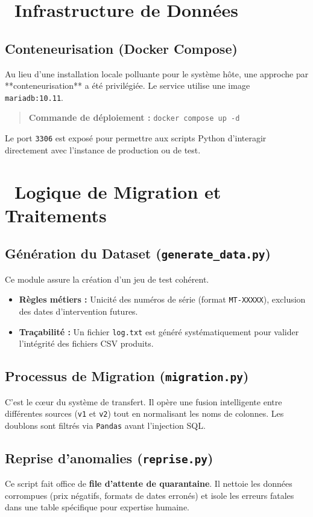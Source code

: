 \documentclass[12pt, a4paper]{article}
\begin{document}
\section{\faDocker \ Infrastructure de Données}
\subsection{Conteneurisation (Docker Compose)}
Au lieu d'une installation locale polluante pour le système hôte, une approche par **conteneurisation** a été privilégiée. Le service utilise une image \texttt{mariadb:10.11}. 
\begin{quote}
    \textbf{Commande de déploiement :} \texttt{docker compose up -d}
\end{quote}
Le port \texttt{3306} est exposé pour permettre aux scripts Python d'interagir directement avec l'instance de production ou de test.

\section{\faPython \ Logique de Migration et Traitements}

\subsection{Génération du Dataset (\texttt{generate\_data.py})}
Ce module assure la création d'un jeu de test cohérent. 
\begin{itemize}
    \item \textbf{Règles métiers :} Unicité des numéros de série (format \texttt{MT-XXXXX}), exclusion des dates d'intervention futures.
    \item \textbf{Traçabilité :} Un fichier \texttt{log.txt} est généré systématiquement pour valider l'intégrité des fichiers CSV produits.
\end{itemize}

\subsection{Processus de Migration (\texttt{migration.py})}
C'est le cœur du système de transfert. Il opère une fusion intelligente entre différentes sources (\texttt{v1} et \texttt{v2}) tout en normalisant les noms de colonnes. Les doublons sont filtrés via \texttt{Pandas} avant l'injection SQL.

\subsection{Reprise d'anomalies (\texttt{reprise.py})}
Ce script fait office de \textbf{file d'attente de quarantaine}. Il nettoie les données corrompues (prix négatifs, formats de dates erronés) et isole les erreurs fatales dans une table spécifique pour expertise humaine.
\end{document}
